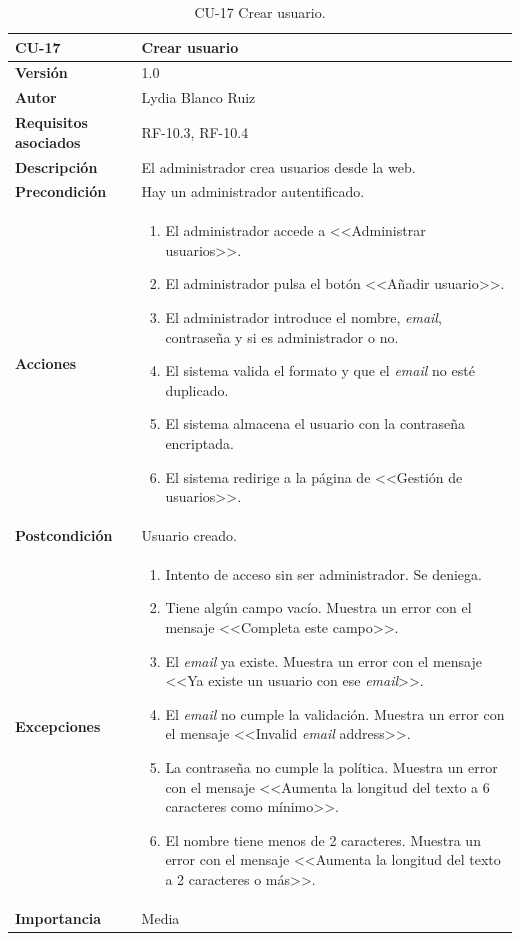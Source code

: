 \begin{table}[p]
	\centering
	\begin{tabularx}{\linewidth}{ p{} p{} }
		\toprule
		\textbf{CU-17}    & \textbf{ Crear usuario}\\
		\toprule
		\textbf{Versión}              & 1.0    \\
		\textbf{Autor}                & Lydia Blanco Ruiz \\
		\textbf{Requisitos asociados} & RF-10.3, RF-10.4 \\
		\textbf{Descripción}          & El administrador crea usuarios desde la web. \\
		\textbf{Precondición}         & Hay un administrador autentificado. \\
		\textbf{Acciones}             &
		\begin{enumerate}
			\def\labelenumi{\arabic{enumi}.}
			\tightlist
			\item El administrador accede a <<Administrar usuarios>>.
			\item El administrador pulsa el botón <<Añadir usuario>>.
			\item El administrador introduce el nombre, \textit{email}, contraseña y si es administrador o no.
			\item El sistema valida el formato y que el \textit{email} no esté duplicado.
			\item El sistema almacena el usuario con la contraseña encriptada.
			\item El sistema redirige a la página de <<Gestión de usuarios>>.
		\end{enumerate}\\
		\textbf{Postcondición}        & Usuario creado. \\
		\textbf{Excepciones}          & 
		\begin{enumerate}
			\def\labelenumi{\arabic{enumi}.}
			\tightlist
			\item Intento de acceso sin ser administrador. Se deniega.
			\item Tiene algún campo vacío. Muestra un error con el mensaje <<Completa este campo>>.
			\item El \textit{email} ya existe. Muestra un error con el mensaje <<Ya existe un usuario con ese \textit{email}>>.
			\item El \textit{email} no cumple la validación. Muestra un error con el mensaje <<Invalid \textit{email} address>>.
			\item La contraseña no cumple la política. Muestra un error con el mensaje <<Aumenta la longitud del texto a 6 caracteres como mínimo>>.
			\item El nombre tiene menos de 2 caracteres. Muestra un error con el mensaje <<Aumenta la longitud del texto a 2 caracteres o más>>.
		\end{enumerate}\\
		\textbf{Importancia}          & Media  \\
		\bottomrule
	\end{tabularx}
	\caption{CU-17 Crear usuario.}
\end{table}

